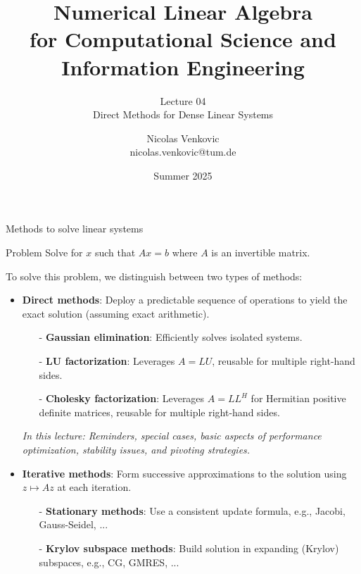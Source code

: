 \documentclass[t,usepdftitle=false]{beamer}
\title[NLA for CS and IE -- Lecture 04]{Numerical Linear Algebra\\for Computational Science and Information Engineering}
\subtitle{\vspace{.3cm}Lecture 04\\Direct Methods for Dense Linear Systems}
\date[Summer 2025]{Summer 2025}
\author[nicolas.venkovic@tum.de]{Nicolas Venkovic\\{\small nicolas.venkovic@tum.de}}
\institute[]{Group of Computational Mathematics\\School of Computation, Information and Technology\\Technical University of Munich}
\begin{document}
	
\begin{frame}
	\maketitle
\end{frame}
	
\myoutlineframe
	
\begin{frame}{Methods to solve linear systems}
\vspace{-.1cm}
\begin{block}{Problem}
Solve for $x$ such that $Ax=b$ where $A$ is an invertible matrix.
\end{block}
\vspace{-.075cm}
To solve this problem, we distinguish between two types of methods:\vspace{.05cm}
\begin{itemize} 
\item \textbf{Direct methods}: 
Deploy a predictable sequence of operations to yield the exact solution (assuming exact arithmetic).\vspace{.05cm}
\begin{itemize}
\item[-] \textbf{Gaussian elimination}: Efficiently solves isolated systems.\vspace{.05cm}
\item[-] \textbf{LU factorization}: Leverages $A=LU$, reusable for multiple right-hand sides.\vspace{.05cm}
\item[-] \textbf{Cholesky factorization}: Leverages $A=LL^H$ for Hermitian positive definite matrices, reusable for multiple right-hand sides.
\end{itemize}
\textit{In this lecture: Reminders, special cases, basic aspects of performance optimization, stability issues, and pivoting strategies.}\vspace{.05cm}
\item \textbf{Iterative methods}: Form successive approximations to the solution using $z\mapsto Az$ at each iteration.\vspace{.05cm}
\begin{itemize}
\item[-] \textbf{Stationary methods}: Use a consistent update formula, e.g., Jacobi, Gauss-Seidel, ...\vspace{.05cm}
\item[-] \textbf{Krylov subspace methods}: Build solution in expanding (Krylov) subspaces, e.g., CG, GMRES, ...
\end{itemize}
\end{itemize}
\end{frame}
\end{document}
